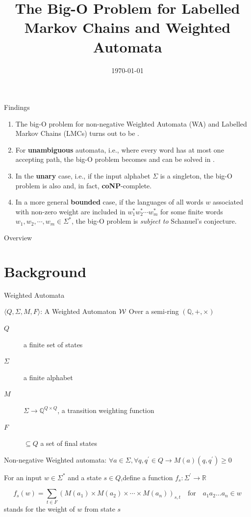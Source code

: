 \documentclass[aspectratio=169]{beamer}
\title{The Big-O Problem for Labelled Markov Chains and Weighted Automata\footfullcite{chistikov2020big}}
\date{\today}
\begin{document}
\begin{frame}
    \titlepage
\end{frame}

\begin{frame}{Findings}
    \begin{enumerate}
        \item The big-O problem for non-negative Weighted Automata (WA) and  Labelled Markov Chains (LMCs) turns out to be .
        \item For \textbf{unambiguous} automata, i.e., where every word has at most one accepting path, the big-O problem becomes  and can be solved in .
        \item In the \textbf{unary} case, i.e., if the input alphabet $\Sigma$ is a singleton, the big-O problem is
        also  and, in fact, \textbf{coNP}-complete.
        \item In a more general \textbf{bounded} case, if the languages of all words $w$ associated with non-zero weight are included in  $w_1^*w_2^*\cdots w_m^*$ for some finite words  $w_1,w_2,\cdots, w_m \in \Sigma^*$, the big-O problem is  \textit{subject to} Schanuel’s conjecture.
    \end{enumerate}
\end{frame}

\begin{frame}{Overview}
    \tableofcontents
\end{frame}

\section{Background}
\begin{frame}{Weighted Automata}
    \begin{block}{$\langle Q, \Sigma,M,F\rangle$: A Weighted Automaton $\cal W$}
        Over a semi-ring $(\mathbb{Q}, +, \times)$
        \begin{description}
            \item[$Q$] a finite set of states
            \item[$\Sigma$] a finite alphabet
            \item[$M$] $\Sigma \to \mathbb{Q}^{Q \times Q}$, a transition weighting function
            \item[$F$] $\subseteq Q$ a set of final states
        \end{description}
        Non-negative Weighted automata:  $\forall a \in \Sigma, \forall q,q^\prime \in Q \to M(a)(q,q^\prime) \ge 0 $
    \end{block}

    For an input $w \in \Sigma^*$ and a state $s \in Q$,define a function $f_s: \Sigma^\prime \to \mathbb{R}$

    $$f_s(w) = \sum_{t \in F} (M(a_1) \times M(a_2) \times \cdots \times M(a_n))_{s,t} \quad \text{for} \quad  a_1 a_2 \ldots a_n \in w$$
    stands for the weight of $w$ from state $s$
\end{frame}
\end{document}
